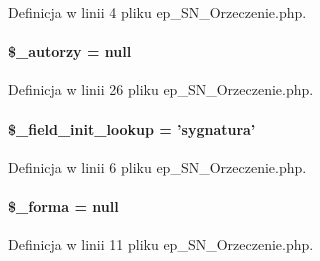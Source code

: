 Definicja w linii 4 pliku ep\-\_\-\-S\-N\-\_\-\-Orzeczenie.\-php.

\hypertarget{classep___s_n___orzeczenie_a979f172256d5c0c7e9a858abeddcfc18}{
\paragraph[{\$\-\_\-autorzy}]{\setlength{\rightskip}{0pt plus 5cm}\$\-\_\-autorzy = null\hspace{0.3cm}{\ttfamily [protected]}}}\label{classep___s_n___orzeczenie_a979f172256d5c0c7e9a858abeddcfc18}


Definicja w linii 26 pliku ep\-\_\-\-S\-N\-\_\-\-Orzeczenie.\-php.

\hypertarget{classep___s_n___orzeczenie_a4a4d54ae35428077a7c61ec8a5139af3}{
\paragraph[{\$\-\_\-field\-\_\-init\-\_\-lookup}]{\setlength{\rightskip}{0pt plus 5cm}\$\-\_\-field\-\_\-init\-\_\-lookup = 'sygnatura'}}\label{classep___s_n___orzeczenie_a4a4d54ae35428077a7c61ec8a5139af3}


Definicja w linii 6 pliku ep\-\_\-\-S\-N\-\_\-\-Orzeczenie.\-php.

\hypertarget{classep___s_n___orzeczenie_a95b4aef311558b8233d9934bd08406ec}{
\paragraph[{\$\-\_\-forma}]{\setlength{\rightskip}{0pt plus 5cm}\$\-\_\-forma = null\hspace{0.3cm}{\ttfamily [protected]}}}\label{classep___s_n___orzeczenie_a95b4aef311558b8233d9934bd08406ec}


Definicja w linii 11 pliku ep\-\_\-\-S\-N\-\_\-\-Orzeczenie.\-php.

